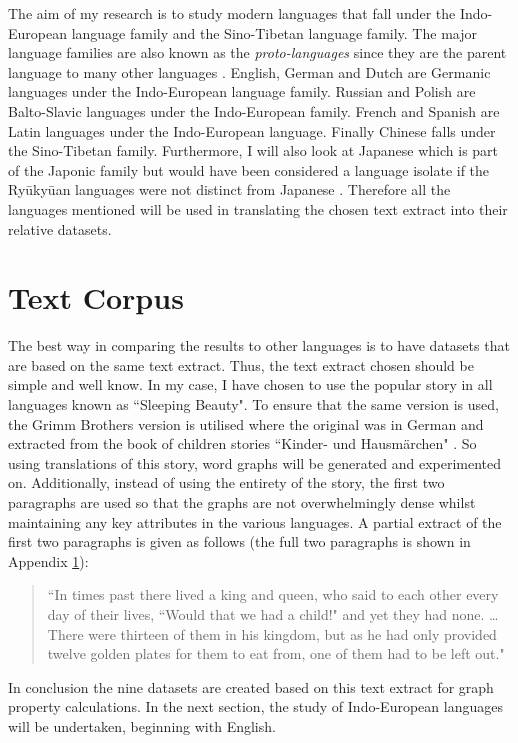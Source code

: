 The aim of my research is to study modern languages that fall under the Indo-European language family and the Sino-Tibetan language family. The major language families are also known as the \emph{proto-languages} since they are the parent language to many other languages \cite{rowe2022concise}. English, German and Dutch are Germanic languages under the Indo-European language family. Russian and Polish are Balto-Slavic languages under the Indo-European family.  French and Spanish are Latin languages under the Indo-European language. Finally Chinese falls under the Sino-Tibetan family. Furthermore, I will also look at Japanese which is part of the Japonic family but would have been considered a language isolate if the Ryūkyūan languages were not distinct from Japanese \cite{campbell2010language}. Therefore all the languages mentioned will be used in translating the chosen text extract into their relative datasets.

\section{Text Corpus}
The best way in comparing the results to other languages is to have datasets that are based on the same text extract. Thus, the text extract chosen should be simple and well know. In my case, I have chosen to use the popular story in all languages known as ``Sleeping Beauty". To ensure that the same version is used, the Grimm Brothers version is utilised where the original was in German and extracted from the book of children stories ``Kinder- und Hausmärchen" \cite{grimm1857kinder}. So using translations of this story, word graphs will be generated and experimented on.  Additionally, instead of using the entirety of the story, the first two paragraphs are used so that the graphs are not overwhelmingly dense whilst maintaining any key attributes in the various languages. A partial extract of the first two paragraphs is given as follows (the full two paragraphs is shown in Appendix \ref{}):
\begin{quote}
``In times past there lived a king and queen, who said to each other every day of their lives, ``Would that we had a child!" and yet they had none. \dots There were thirteen of them in his kingdom, but as he had only provided twelve golden plates for them to eat from, one of them had to be left out."
\end{quote}
In conclusion the nine datasets are created based on this text extract for graph property calculations. In the next section, the study of Indo-European languages will be undertaken, beginning with English.

